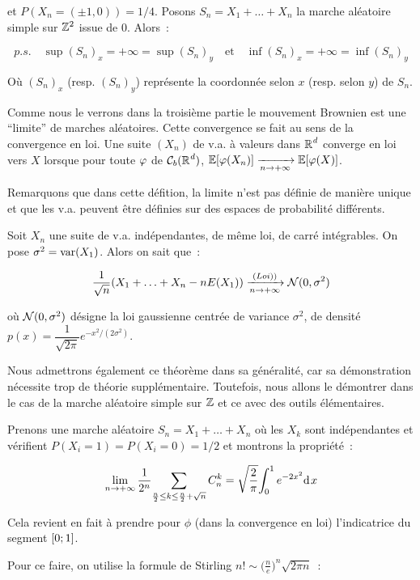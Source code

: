 et $P(X_n = (\pm 1, 0)) = 1/4$. Posons $S_n = X_1 +\ldots+X_n$ la marche aléatoire simple sur 
${\mathbb{Z}}^2$ issue de $0$. Alors~:\par
$$p.s.\quad\sup (S_n)_x=+\infty=\sup(S_n)_y\quad\mathrm{et}\quad\inf(S_n)_x=+\infty=\inf (S_n)_y$$
\par
O\`u $(S_n)_x$ (resp. $(S_n)_y$) représente la coordonnée selon $x$ (resp. selon $y$) de $S_n$.\par
{}
Comme nous le verrons dans la troisième partie le mouvement Brownien est 
une ``limite'' de marches aléatoires. Cette convergence se fait au sens de la convergence en loi.
 Une suite $(X_n)$ de v.a. à valeurs dans ${\mathbb{R}^{}}^d$ converge en loi vers
$X$ lorsque pour toute $\varphi$ de $\mathcal{C}_b({\mathbb{R}^{}}^d)$, $\mathbb{E}\lbrack \varphi(X_n)\rbrack\xrightarrow[n \rightarrow +\infty]{}\mathbb{E}\lbrack \varphi(X)\rbrack$.\par
Remarquons que dans cette défition, la limite n'est pas définie de manière unique et que les
v.a. peuvent être définies sur des espaces de probabilité différents.\par
{} Soit $X_n$ une suite de v.a. indépendantes, de même loi, de carré intégrables.
On pose $\sigma^2 = \textrm{var}(X_1)$. Alors on sait que~:\par
$$\dfrac{1}{\sqrt{n}}(X_1 + \ldots+X_n - nE(X_1))\xrightarrow[n \rightarrow +\infty]{(Loi))} \mathcal{N}(0,\sigma^2)$$\par
o\`u $\mathcal{N}(0,\sigma^2)$ désigne la loi gaussienne centrée de variance $\sigma^2$, de densité
$p(x) = \dfrac{1}{\sqrt{2\pi}}e^{-x^2/(2\sigma^2)}$.\par
Nous admettrons également ce théorème dans sa généralité, car sa démonstration nécessite trop de théorie supplémentaire. 
Toutefois, nous allons le démontrer dans le cas de la marche 
aléatoire simple sur $\mathbb{Z}$ et ce avec des outils élémentaires.\par
Prenons une marche aléatoire $S_n = X_1 + \ldots + X_n$ o\`u les $X_k$ sont indépendantes et vérifient $P(X_i=1)=P(X_i=0) = 1/2$ et
montrons la propriété~:\par
$$\lim_{n\rightarrow +\infty}\dfrac{1}{2^n}{\displaystyle \sum_{\frac{n}{2}\leq k\leq\frac{n}{2}+\sqrt{n}}^{}{C^k_n}}=\sqrt{\dfrac{2}{\pi}}{\displaystyle\int_{0}^{1}{e^{-2x^2}\mathrm{d}\hspace{1pt}{x}}}$$
\par
Cela revient en fait à prendre pour $\phi$ (dans la convergence en loi) l'indicatrice du segment $[0;1]$.\par
Pour ce faire, on utilise la formule de Stirling $n!\sim \bigl(\frac{n}{e}\bigr)^n\sqrt{2\pi n}$~:\par
